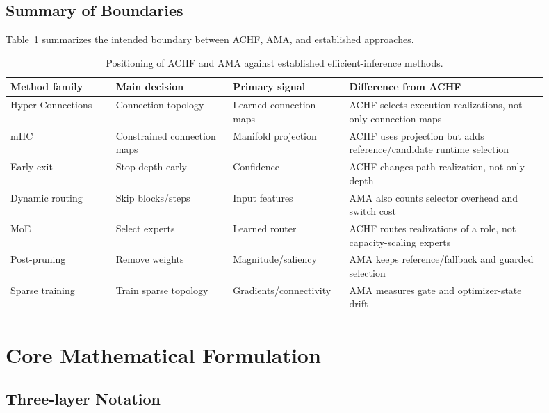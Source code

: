 \documentclass{article}
\newcommand{\achf}{\textsc{ACHF}}
\newcommand{\ama}{\textsc{AMA}}
\begin{document}
\subsection{Summary of Boundaries}

Table~\ref{tab:method-boundaries} summarizes the intended boundary between
\achf{}, \ama{}, and established approaches.

\begin{table}[h]
\centering
\caption{Positioning of \achf{} and \ama{} against established efficient-inference methods.}
\label{tab:method-boundaries}
\small
\begin{tabular}{p{0.18\linewidth}p{0.20\linewidth}p{0.18\linewidth}p{0.34\linewidth}}
\toprule
Method family & Main decision & Primary signal & Difference from \achf{} \\
\midrule
Hyper-Connections & Connection topology & Learned connection maps & \achf{} selects execution realizations, not only connection maps \\
mHC & Constrained connection maps & Manifold projection & \achf{} uses projection but adds reference/candidate runtime selection \\
Early exit & Stop depth early & Confidence & \achf{} changes path realization, not only depth \\
Dynamic routing & Skip blocks/steps & Input features & \ama{} also counts selector overhead and switch cost \\
MoE & Select experts & Learned router & \achf{} routes realizations of a role, not capacity-scaling experts \\
Post-pruning & Remove weights & Magnitude/saliency & \ama{} keeps reference/fallback and guarded selection \\
Sparse training & Train sparse topology & Gradients/connectivity & \ama{} measures gate and optimizer-state drift \\
\bottomrule
\end{tabular}
\end{table}

\section{Core Mathematical Formulation}
\label{sec:formalism}

\subsection{Three-layer Notation}
\end{document}

